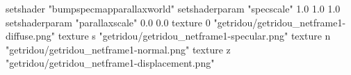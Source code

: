 setshader "bumpspecmapparallaxworld"
setshaderparam "specscale" 1.0 1.0 1.0
setshaderparam "parallaxscale" 0.0 0.0
texture 0 "getridou/getridou_netframe1-diffuse.png"
texture s "getridou/getridou_netframe1-specular.png"
texture n "getridou/getridou_netframe1-normal.png"
texture z "getridou/getridou_netframe1-displacement.png"

